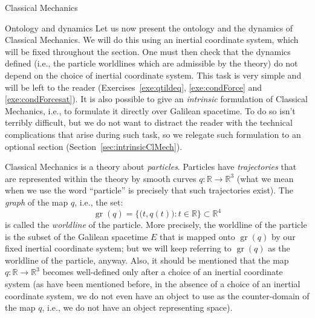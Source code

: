 \documentclass[oneside,a4paper,11pt]{amsbook}
\newcommand{\R}{\mathds R}
\DeclareMathOperator{\Gr}{gr}
\theoremstyle{remark}\newtheorem{exercise}{Exercise}[chapter]
\theoremstyle{plain}\newtheorem{teo}{Theorem}[section]
\theoremstyle{plain}\newtheorem{lem}[teo]{Lemma}
\theoremstyle{plain}\newtheorem{prop}[teo]{Proposition}
\theoremstyle{plain}\newtheorem{cor}[teo]{Corollary}
\theoremstyle{definition}\newtheorem{defin}[teo]{Definition}
\theoremstyle{remark}\newtheorem{rem}[teo]{Remark}
\theoremstyle{definition}\newtheorem{notation}[teo]{Notation}
\theoremstyle{definition}\newtheorem{convention}[teo]{Convention}
\theoremstyle{definition}\newtheorem{example}[teo]{Example}
\numberwithin{section}{chapter}
\numberwithin{equation}{section}
\begin{document}
\begin{chapter}{Classical Mechanics}
\begin{section}{Ontology and dynamics}
Let us now present the ontology and the dynamics of Classical Mechanics. We will do this using an inertial coordinate
system, which will be fixed throughout the section. One must then check that the dynamics defined (i.e.,
the particle worldlines which are admissible by the theory) do not depend on the choice of inertial coordinate system.
This task is very simple and will be left to the reader (Exercises~\ref{exe:qtildeq}, \ref{exe:condForce}
and \ref{exe:condForcesat}). It is also
possible to give an {\em intrinsic\/} formulation of Classical Mechanics, i.e., to formulate it directly over Galilean
spacetime. To do so isn't terribly difficult, but we do not want to distract the reader with the technical complications
that arise during such task, so we relegate such formulation to an optional section (Section~\ref{sec:intrinsicClMech}).

Classical Mechanics is a theory about {\em particles}. Particles have {\em trajectories\/} that are
represented within the theory by smooth curves $q:\R\to\R^3$ (what we mean when we use the word ``particle'' is precisely
that such trajectories exist). The {\em graph\/} of the map $q$, i.e., the set:
\[\Gr(q)=\big\{\big(t,q(t)\big):t\in\R\big\}\subset\R^4\]
is called the {\em worldline\/} of the particle. More precisely, the worldline of the particle is the subset of the Galilean
spacetime $E$ that is mapped onto $\Gr(q)$ by our fixed inertial coordinate system; but we will keep referring
to $\Gr(q)$ as the worldline of the particle, anyway. Also, it should be mentioned that the map $q:\R\to\R^3$ becomes well-defined
only after a choice of an inertial coordinate system (as have been mentioned before, in the absence of a choice
of an inertial coordinate system, we do not even have an object to use as the counter-domain of the map $q$, i.e.,
we do not have an object representing space).


\end{section}
\end{chapter}
\end{document}
